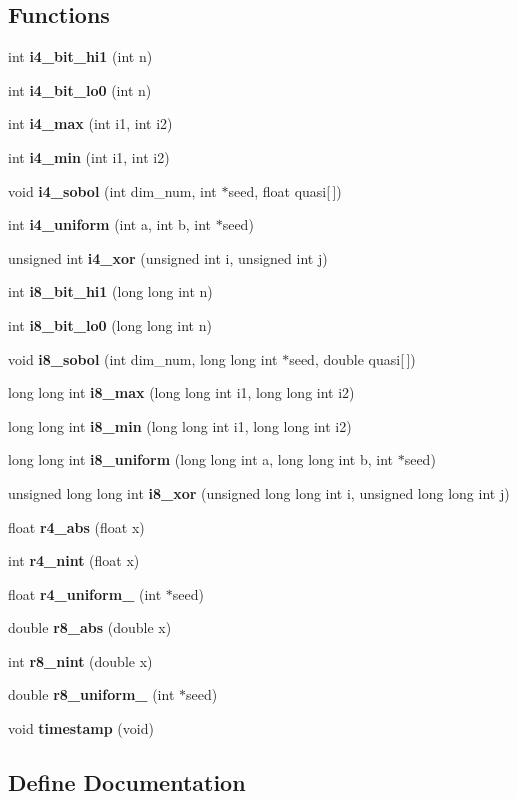 \subsection*{Functions}
\begin{CompactItemize}
\item 
int {\bf i4\_\-bit\_\-hi1} (int n)
\item 
int {\bf i4\_\-bit\_\-lo0} (int n)
\item 
int {\bf i4\_\-max} (int i1, int i2)
\item 
int {\bf i4\_\-min} (int i1, int i2)
\item 
void {\bf i4\_\-sobol} (int dim\_\-num, int $\ast$seed, float quasi[$\,$])
\item 
int {\bf i4\_\-uniform} (int a, int b, int $\ast$seed)
\item 
unsigned int {\bf i4\_\-xor} (unsigned int i, unsigned int j)
\item 
int {\bf i8\_\-bit\_\-hi1} (long long int n)
\item 
int {\bf i8\_\-bit\_\-lo0} (long long int n)
\item 
void {\bf i8\_\-sobol} (int dim\_\-num, long long int $\ast$seed, double quasi[$\,$])
\item 
long long int {\bf i8\_\-max} (long long int i1, long long int i2)
\item 
long long int {\bf i8\_\-min} (long long int i1, long long int i2)
\item 
long long int {\bf i8\_\-uniform} (long long int a, long long int b, int $\ast$seed)
\item 
unsigned long long int {\bf i8\_\-xor} (unsigned long long int i, unsigned long long int j)
\item 
float {\bf r4\_\-abs} (float x)
\item 
int {\bf r4\_\-nint} (float x)
\item 
float {\bf r4\_\-uniform\_} (int $\ast$seed)
\item 
double {\bf r8\_\-abs} (double x)
\item 
int {\bf r8\_\-nint} (double x)
\item 
double {\bf r8\_\-uniform\_} (int $\ast$seed)
\item 
void {\bf timestamp} (void)
\end{CompactItemize}


\subsection{Define Documentation}
